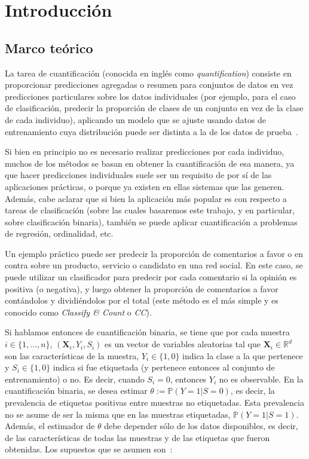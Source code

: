 \chapter{Introducción}

\section{Marco teórico}

La tarea de cuantificación (conocida en inglés como {\it quantification\/})
consiste en proporcionar predicciones agregadas o resumen para conjuntos de
datos en vez predicciones particulares sobre los datos individuales (por
ejemplo, para el caso de clasificación, predecir la proporción de clases de un
conjunto en vez de la clase de cada individuo), aplicando un modelo que se
ajuste usando datos de entrenamiento cuya distribución puede ser distinta a la
de los datos de prueba~\cite{forman2005counting}.

Si bien en principio no es necesario realizar predicciones por cada individuo,
muchos de los métodos se basan en obtener la cuantificación de esa manera, ya
que hacer predicciones individuales suele ser un requisito de por sí de las
aplicaciones prácticas, o porque ya existen en ellas sistemas que las generen.
Además, cabe aclarar que si bien la aplicación más popular es con respecto a
tareas de clasificación (sobre las cuales basaremos este trabajo, y en
particular, sobre clasificación binaria), también se puede aplicar
cuantificación a problemas de regresión, ordinalidad, etc.

Un ejemplo práctico puede ser predecir la proporción de comentarios a favor o en
contra sobre un producto, servicio o candidato en una red social. En este caso,
se puede utilizar un clasificador para predecir por cada comentario si la
opinión es positiva (o negativa), y luego obtener la proporción de comentarios a
favor contándolos y dividiéndolos por el total (este método es el más simple y
es conocido como {\it Classify \& Count\/} o {\it CC\/}).

Si hablamos entonces de cuantificación binaria, se tiene que por cada muestra $i
\in \{1,\dots,n\}$, $(\mathbf{X}_i,Y_i,S_i)$ es un vector de variables
aleatorias tal que $\mathbf{X}_i \in \mathbb{R}^d$ son las características de la
muestra, $Y_i \in \{1,0\}$ indica la clase a la que pertenece y $S_i \in
\{1,0\}$ indica si fue etiquetada (y pertenece entonces al conjunto de
entrenamiento) o no. Es decir, cuando $S_i=0$, entonces $Y_i$ no es observable.
En la cuantificación binaria, se desea estimar $\theta:= \mathbb{P}(Y=1|S=0)$,
es decir, la prevalencia de etiquetas positivas entre muestras no etiquetadas.
Esta prevalencia no se asume de ser la misma que en las muestras etiquetadas,
$\mathbb{P}(Y=1|S=1)$. Además, el estimador de $\theta$ debe depender sólo de
los datos disponibles, es decir, de las características de todas las muestras y
de las etiquetas que fueron obtenidas. Los supuestos que se asumen
son~\cite{vaz2019quantification}:

